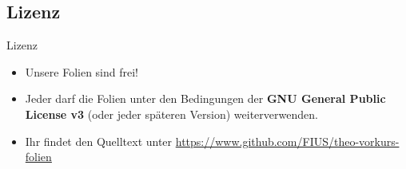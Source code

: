 %
%
%
%

\subsection{Lizenz}
\begin{frame}[fragile]{Lizenz}
    \begin{itemize}
    \item Unsere Folien sind frei!\\
    \item Jeder darf die Folien unter den Bedingungen der \textbf{GNU General Public License v3} (oder jeder späteren Version) weiterverwenden.\\
    \item Ihr findet den Quelltext unter \url{https://www.github.com/FIUS/theo-vorkurs-folien}
    \end{itemize}
\end{frame}